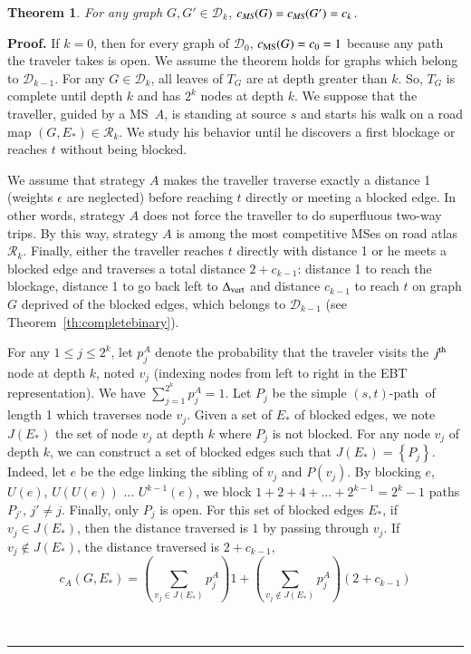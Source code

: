 \documentclass[preprint]{elsarticle}
\newtheorem{theorem}{Theorem}
\newenvironment{proof}[1][Proof]{\textbf{#1.} }{\ \rule{0.5em}{0.5em}}
\newcommand{\set}[1]{\left\{ #1 \right\}}
\newcommand{\ith}[1]{#1^{\mbox{\scriptsize{th}}}}
\newcommand{\stpath}{$(s,t)$-path}
\newcommand{\mcalr}{\mathcal{R}}
\newcommand{\mcald}{\mathcal{D}}
\newcommand{\mts}{MS}
\newcommand{\deltavert}{\Delta_{\mbox{\scriptsize{vert}}}}
\newcommand{\cms}{c_{\mbox{\scriptsize{MS}}}}
\begin{document}
\begin{theorem}
For any graph $G, G' \in \mcald_k$, $c_{\emph{\scriptsize{MS}}}(G) = c_{\emph{\scriptsize{MS}}}(G') = c_k$.
\label{th:equalcompetitive}
\end{theorem}
\begin{proof}
If $k = 0$, then for every graph of $\mcald_0$, $\cms(G) = c_0 = 1$ because any path the traveler takes is open.
We assume the theorem holds for graphs which belong to $\mcald_{k-1}$. For any $G \in \mcald_k$, all leaves of $T_G$ are at depth greater than $k$. So, $T_G$ is complete until depth $k$ and has $2^k$ nodes at depth $k$. We suppose that the traveller, guided by a \mts ~$A$, is standing at source $s$ and starts his walk on a road map $\left(G,E_*\right) \in \mcalr_k$. We study his behavior until he discovers a first blockage or reaches $t$ without being blocked.

We assume that strategy $A$ makes the traveller traverse exactly a distance 1 (weights $\epsilon$ are neglected) before reaching $t$ directly or meeting a blocked edge. In other words, strategy $A$ does not force the traveller to do superfluous two-way trips. By this way, strategy $A$ is among the most competitive \mts es on road atlas $\mcalr_k$. Finally, either the traveller reaches $t$ directly with distance 1 or he meets a blocked edge and traverses a total distance $2 + c_{k-1}$: distance 1 to reach the blockage, distance 1 to go back left to $\deltavert$ and distance $c_{k-1}$ to reach $t$ on graph $G$ deprived of the blocked edges, which belongs to $\mcald_{k-1}$ (see Theorem~\ref{th:completebinary}).

For any $1 \le j \le 2^k$, let $p_j^A$ denote the probability that the traveler visits the $\ith{j}$ node at depth $k$, noted $v_j$ (indexing nodes from left to right in the EBT representation). We have $\sum_{j=1}^{2^k} p_j^A = 1$. Let $P_j$ be the simple \stpath ~of length 1 which traverses node $v_j$.
Given a set of $E_*$ of blocked edges, we note $J(E_*)$ the set of node $v_j$ at depth $k$ where $P_j$ is not blocked. For any node $v_j$ of depth $k$, we can construct a set of blocked edges such that $J(E_*) = \set{P_j}$. Indeed, let $e$ be the edge linking the sibling of $v_j$ and $P\left(v_j\right)$. By blocking $e$,  $U(e)$, $U(U(e))$ ... $U^{k-1}(e)$, we block $1+2+4+\ldots+2^{k-1} = 2^k - 1$ paths $P_{j'}$, $j' \neq j$. Finally, only $P_j$ is open.
For this set of blocked edges $E_*$, if $v_j \in J(E_*)$, then the distance traversed is $1$ by passing through $v_j$. If $v_j \notin J(E_*)$, the distance traversed is $2 + c_{k-1}$,
\[
c_A(G, E_*) = \left(\sum_{v_j\in J(E_*)} p_j^A\right) 1 + \left(\sum_{v_j\notin J(E_*)}p_j^A\right) (2+c_{k-1})
\]


\end{proof}
\end{document}
